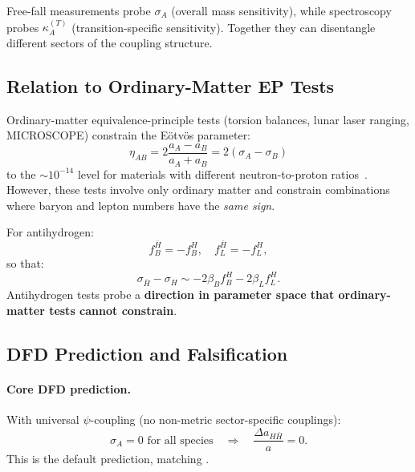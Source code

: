 \begin{remark}
Free-fall measurements probe $\sigma_A$ (overall mass sensitivity), while 
spectroscopy probes $\kappa_A^{(T)}$ (transition-specific sensitivity). 
Together they can disentangle different sectors of the \DFD coupling structure.
\end{remark}

\subsection{Relation to Ordinary-Matter EP Tests}\label{sec:antimatter-ordinary}

Ordinary-matter equivalence-principle tests (torsion balances, lunar laser 
ranging, MICROSCOPE) constrain the E\"otv\"os parameter:
\begin{equation}
\eta_{AB} = 2\frac{a_A - a_B}{a_A + a_B} = 2(\sigma_A - \sigma_B)
\end{equation}
to the $\sim 10^{-14}$ level for materials with different neutron-to-proton 
ratios~\cite{Will2014}. However, these tests involve only ordinary matter 
and constrain combinations where baryon and lepton numbers have the \textit{same sign}.

For antihydrogen:
\begin{equation}
f_B^{\bar{H}} = -f_B^H, \quad f_L^{\bar{H}} = -f_L^H,
\end{equation}
so that:
\begin{equation}
\sigma_{\bar{H}} - \sigma_H \sim -2\beta_B f_B^H - 2\beta_L f_L^H.
\end{equation}
Antihydrogen tests probe a \textbf{direction in parameter space that 
ordinary-matter tests cannot constrain}.

\subsection{DFD Prediction and Falsification}\label{sec:antimatter-falsifier}

\paragraph{Core DFD prediction.}
With universal $\psi$-coupling (no non-metric sector-specific couplings):
\begin{equation}
\sigma_A = 0 \text{ for all species} \quad \Rightarrow \quad \frac{\Delta a_{H\bar{H}}}{a} = 0.
\end{equation}
This is the default \DFD prediction, matching \GR.

